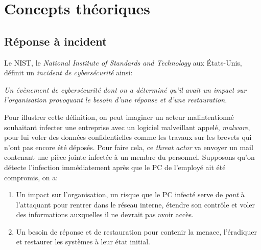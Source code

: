 
\chapter{Concepts théoriques}










\section{Réponse à incident}


Le NIST, le \textit{National Institute of Standards and Technology} aux États-Unis, définit un \textit{incident de cybersécurité} ainsi: \cite{1}

\begin{customquote}
    \itshape Un évènement de cybersécurité dont on a déterminé qu'il avait un impact sur l'organisation provoquant le besoin d'une réponse et d'une restauration.
\end{customquote}

Pour illustrer cette définition, on peut imaginer un acteur malintentionné souhaitant infecter une entreprise avec un logiciel malveillant appelé, \textit{malware}, pour lui voler des données confidentielles comme les travaux sur les brevets qui n'ont pas encore été déposés. Pour faire cela, ce \textit{threat actor} va envoyer un mail contenant une pièce jointe infectée à un membre du personnel. Supposons qu'on détecte l'infection immédiatement après que le PC de l'employé ait été compromis, on a:
\begin{enumerate}
    \item Un impact sur l'organisation, un risque que le PC infecté serve de \textit{pont} à l'attaquant pour rentrer dans le réseau interne, étendre son contrôle et voler des informations auxquelles il ne devrait pas avoir accès.
    \item Un besoin de réponse et de restauration pour contenir la menace, l'éradiquer et restaurer les systèmes à leur état initial.
\end{enumerate}

